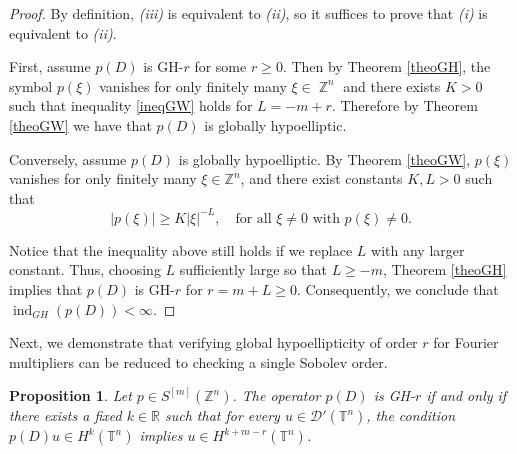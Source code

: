 \documentclass[11pt]{amsart}
\numberwithin{equation}{section}
\newtheorem{proposition}[theorem]{Proposition}
\theoremstyle{definition}
\DeclareMathOperator{\Z}{\mathbb{Z}}
\begin{document}
	\begin{proof}
		By definition, {\it (iii)} is equivalent to {\it (ii)}, so it suffices to prove that {\it (i)} is equivalent to {\it (ii)}.
		
		First, assume \( p(D) \) is GH-\( r \) for some \( r \geq 0 \). Then by Theorem \ref{theoGH}, the symbol $p(\xi)$ vanishes for only finitely many $\xi\in\Z^n$ and there exists $K>0$ such that inequality \ref{ineqGW} holds for $L=-m+r$. Therefore by Theorem \ref{theoGW} we have that $p(D)$ is globally hypoelliptic.
		
		Conversely, assume \( p(D) \) is globally hypoelliptic. By Theorem \ref{theoGW}, \( p(\xi) \) vanishes for only finitely many \( \xi \in \mathbb{Z}^n \), and there exist constants \( K, L > 0 \) such that
		\[
		|p(\xi)| \geq K |\xi|^{-L}, \quad \text{for all } \xi \neq 0 \text{ with } p(\xi) \neq 0.
		\]
		
		Notice that the inequality above still holds if we replace \( L \) with any larger constant. Thus, choosing \( L \) sufficiently large so that \( L \geq -m \), Theorem \ref{theoGH} implies that \( p(D) \) is GH-\( r \) for \( r = m + L \geq 0 \). Consequently, we conclude that \( \operatorname{ind}_{GH}(p(D)) < \infty \).  		
	\end{proof}
	
	Next, we demonstrate that verifying global hypoellipticity of order \( r \) for Fourier multipliers can be reduced to checking a single Sobolev order.
	
    \begin{proposition}\label{prop_single_sobolev_order}
    	Let \( p \in S^{[m]}(\mathbb{Z}^n) \). The operator \( p(D) \) is GH-\( r \) if and only if there exists a fixed \( k \in \mathbb{R} \) such that for every \( u \in \mathscr{D}'(\mathbb{T}^n) \), the condition \( p(D)u \in H^k(\mathbb{T}^n) \) implies \( u \in H^{k + m - r}(\mathbb{T}^n) \).
    \end{proposition}
    
\end{document}
